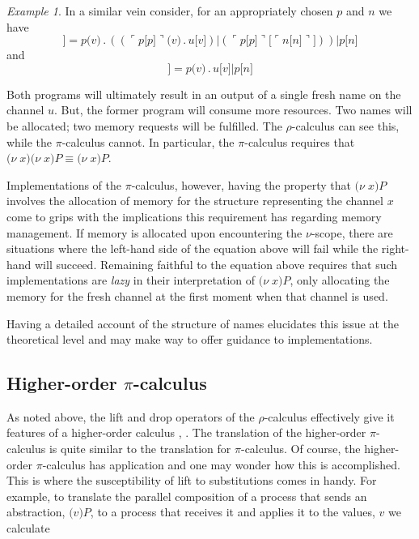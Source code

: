 \documentclass[]{amsart}
\newcommand{\ldb}{[\![}
\newcommand{\rdb}{]\!]}
\newcommand{\lpquote}{\ulcorner}
\newcommand{\rpquote}{\urcorner}
\newcommand{\newkw}{\nu}
\newcommand{\id}[1]{\texttt{#1}}
\newcommand{\juxtap}{\mathbin{\id{|}}}
\newcommand{\concat}{\mathbin{.}}
\newcommand{\binpar}[2]{#1 \juxtap #2}
\newcommand{\outputp}[2]{#1 \id{[} #2 \id{]}}
\newcommand{\prefix}[3]{#1 \id{(} #2 \id{)} \concat #3}
\newcommand{\quotep}[1]{\lpquote #1 \rpquote}
\newcommand{\newp}[2]{\id{(}\newkw \; #1 \id{)} #2}
\newcommand{\absp}[2]{\id{(} #1 \id{)} #2}
\newcommand{\meaningof}[1]{\ldb #1 \rdb}
\theoremstyle{definition}
\theoremstyle{remark}
\newtheorem{example}[thm]{Example}
\numberwithin{equation}{subsection}
\newcommand{\pic}{$\pi$-calculus}
\newcommand{\rhoc}{$\rho$-calculus}
\begin{document}
\begin{example}
	In a similar vein consider, for an appropriately chosen $p$ and $n$ we have
	\begin{equation*}
		\meaningof{\newp{v}{\newp{v}{\outputp{u}{v}}}} = 
			\binpar{\prefix{p}{v}{(\binpar{(\prefix{\quotep{\outputp{p}{p}}}{v}{\outputp{u}{v}})}
					              {(\outputp{\quotep{\outputp{p}{p}}}{\quotep{\outputp{n}{n}}})})}}
			       {\outputp{p}{n}}
	\end{equation*}
	and
	\begin{equation*}
		\meaningof{\newp{v}{\outputp{u}{v}}} = 
				\binpar	{\prefix{p}{v}{\outputp{u}{v}}}
			       		{\outputp{p}{n}}
	\end{equation*}

	Both programs will ultimately result in an output of a single
	fresh name on the channel $u$. But, the former program will
	consume more resources. Two names will be allocated; two memory
	requests will be fulfilled. The {\rhoc} can see this, while the
	{\pic} cannot. In particular, the {\pic} requires that
	$\newp{x}{\newp{x}{P}} \equiv \newp{x}{P}$.

	Implementations of the {\pic}, however, having the property that
	${\newp{x}{P}}$ involves the allocation of memory for the
	structure representing the channel $x$ come to grips with the
	implications this requirement has regarding memory management. If
	memory is allocated upon encountering the $\nu$-scope, there are
	situations where the left-hand side of the equation above will
	fail while the right-hand will succeed. Remaining faithful to the
	equation above requires that such implementations are
	\textit{lazy} in their interpretation of ${\newp{x}{P}}$, only
	allocating the memory for the fresh channel at the first moment
	when that channel is used.

	Having a detailed account of the structure of names elucidates
	this issue at the theoretical level and may make way to offer
	guidance to implementations.
\end{example}

\subsection{Higher-order {\pic}}

As noted above, the lift and drop operators of the {\rhoc} effectively
give it features of a higher-order calculus \cite{hop},
\cite{facile}. The translation of the higher-order {\pic} is quite
similar to the translation for {\pic}. Of course, the higher-order
{\pic} has application and one may wonder how this is
accomplished. This is where the susceptibility of lift to
substitutions comes in handy. For example, to translate the parallel
composition of a process that sends an abstraction, $\absp{v}{P}$, to
a process that receives it and applies it to the values, $v$ we
calculate
\end{document}
